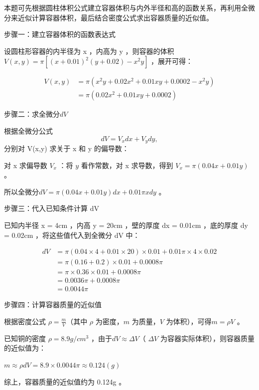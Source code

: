 \documentclass{ctexart}
\begin{document}
本题可先根据圆柱体积公式建立容器体积与内外半径和高的函数关系，再利用全微分来近似计算容器体积，最后结合密度公式求出容器质量的近似值。

步骤一：建立容器体积的函数表达式

设圆柱形容器的内半径为 x ，内高为 y ，则容器的体积$ V(x,y)=\pi[(x + 0.01)^2(y + 0.02)-x^2y]$ ，展开可得：


\begin{align*}
V(x,y)&=\pi(x^2 y+0.02x^2 + 0.01xy+0.0002 - x^2 y)\\
&=\pi(0.02x^2 + 0.01xy+0.0002)
\end{align*}


步骤二：求全微分$ dV $

根据全微分公式 $$dV = V_xdx + V_ydy,$$ 分别对 V(x,y) 求关于 x 和 y 的偏导数：

对 x 求偏导数 $V_x$ ：将 $y$ 看作常数，对 x 求导数，得到 $V_x = \pi(0.04x + 0.01y) $ 。

所以全微分$ dV=\pi(0.04x + 0.01y)dx + 0.01\pi xdy$ 。

步骤三：代入已知条件计算 dV 

已知内半径 x = 4cm ，内高 y = 20cm ，壁的厚度 dx = 0.01cm ，底的厚度 dy = 0.02cm ，将这些值代入到全微分 dV 中：


\begin{align*}
dV&=\pi(0.04\times4 + 0.01\times20)\times0.01 + 0.01\pi\times4\times0.02\\
&=\pi(0.16 + 0.2)\times0.01 + 0.0008\pi\\
&=\pi\times0.36\times0.01 + 0.0008\pi\\
&=0.0036\pi + 0.0008\pi\\
&=0.0044\pi
\end{align*}

步骤四：计算容器质量的近似值

根据密度公式 $\rho=\frac{m}{V} $（其中 $\rho$ 为密度，$ m$ 为质量，$ V$ 为体积），可得$ m = \rho V$ 。

已知铜的密度 $\rho = 8.9g/cm^3$ ，由于$ dV\approx\Delta V $（ $\Delta V$ 为容器实际体积），则容器质量的近似值为：

$ m\approx\rho dV = 8.9\times0.0044\pi\approx0.124(g) $

综上，容器质量的近似值约为 0.124g 。
\end{document}
